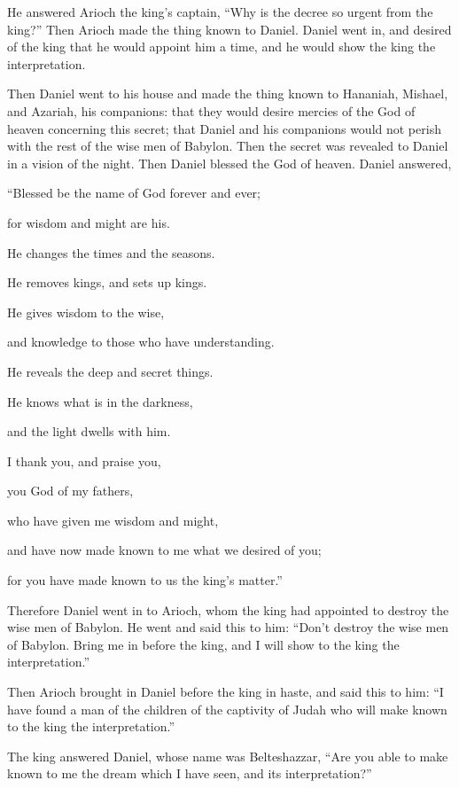 {He answered Arioch the king’s captain, “Why is the decree so urgent from the king?” Then Arioch made the thing known to Daniel.
Daniel went in, and desired of the king that he would appoint him a time, and he would show the king the interpretation.
\par }{\PP {}Then Daniel went to his house and made the thing known to Hananiah, Mishael, and Azariah, his companions:
that they would desire mercies of the God of heaven concerning this secret; that Daniel and his companions would not perish with the rest of the wise men of Babylon.
Then the secret was revealed to Daniel in a vision of the night. Then Daniel blessed the God of heaven.
Daniel answered,
\par }{\Q “Blessed be the name of God forever and ever;
\par }{\QB for wisdom and might are his.
\par }{\Q {}He changes the times and the seasons.
\par }{\QB He removes kings, and sets up kings.
\par }{\Q He gives wisdom to the wise,
\par }{\QB and knowledge to those who have understanding.
\par }{\Q {}He reveals the deep and secret things.
\par }{\QB He knows what is in the darkness,
\par }{\QB and the light dwells with him.
\par }{\Q {}I thank you, and praise you,
\par }{\QB you God of my fathers,
\par }{\Q who have given me wisdom and might,
\par }{\QB and have now made known to me what we desired of you;
\par }{\QB for you have made known to us the king’s matter.”
\par }{\PP {}Therefore Daniel went in to Arioch, whom the king had appointed to destroy the wise men of Babylon. He went and said this to him: “Don’t destroy the wise men of Babylon. Bring me in before the king, and I will show to the king the interpretation.”
\par }{\PP {}Then Arioch brought in Daniel before the king in haste, and said this to him: “I have found a man of the children of the captivity of Judah who will make known to the king the interpretation.”
\par }{\PP {}The king answered Daniel, whose name was Belteshazzar, “Are you able to make known to me the dream which I have seen, and its interpretation?”
}
